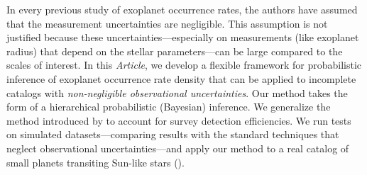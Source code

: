 \documentclass[12pt,preprint]{aastex}
\newcommand{\paper}{\textsl{Article}}
\begin{document}
In every previous study of exoplanet occurrence rates, the authors have
assumed that the measurement uncertainties are negligible.
This assumption is not justified because these uncertainties---especially on
measurements (like exoplanet radius) that depend on the stellar
parameters---can be large compared to the scales of interest.
In this \paper, we develop a flexible framework for probabilistic inference of
exoplanet occurrence rate density that can be applied to incomplete catalogs
with \emph{non-negligible observational uncertainties}.
Our method takes the form of a hierarchical probabilistic (Bayesian)
inference.
We generalize the method introduced by \citet{hogge} to account for survey
detection efficiencies.
We run tests on simulated datasets---comparing results with the standard
techniques that neglect observational uncertainties---and apply our method to
a real catalog of small planets transiting Sun-like stars
(\citealt{petigura}).
\end{document}
